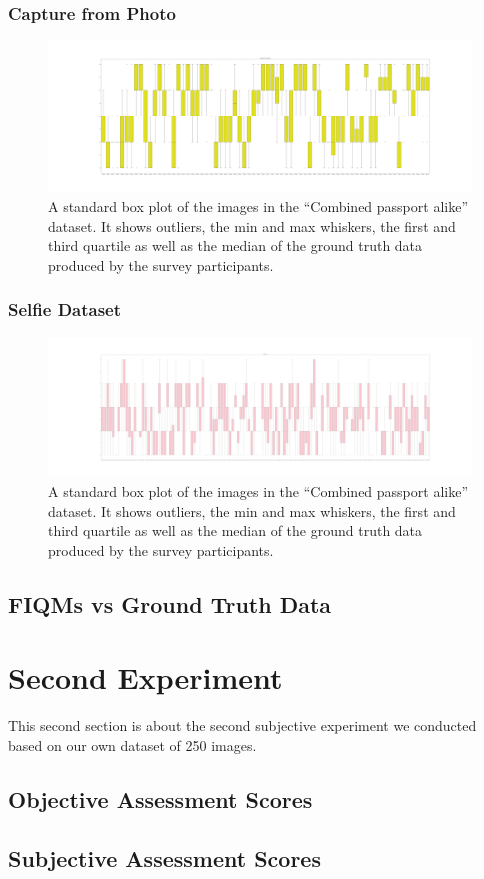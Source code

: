 \subsubsection*{Capture from Photo}
\begin{figure}[h]
    \centering
    \includegraphics[width=1.0\textwidth]{figures/boxplot2.png}
    \caption{A standard box plot of the images in the ``Combined passport alike'' dataset. It shows outliers, the min and max whiskers, the first and third quartile as well as the median of the ground truth data produced by the survey participants.}
    \label{fig:boxplot2}
\end{figure}

\subsubsection*{Selfie Dataset}
\begin{figure}[h]
    \centering
    \includegraphics[width=1.0\textwidth]{figures/boxplot3.png}
    \caption{A standard box plot of the images in the ``Combined passport alike'' dataset. It shows outliers, the min and max whiskers, the first and third quartile as well as the median of the ground truth data produced by the survey participants.}
    \label{fig:boxplot3}
\end{figure}

\subsection{FIQMs vs Ground Truth Data}

\section{Second Experiment}
This second section is about the second subjective experiment we conducted based on our own dataset of 250 images. 
\subsection{Objective Assessment Scores}
\subsection{Subjective Assessment Scores}
